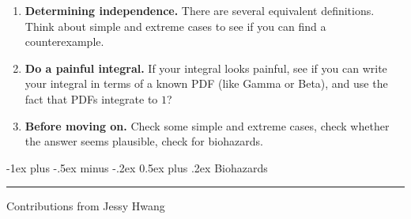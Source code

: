 \documentclass[10pt,landscape]{article}
\makeatletter
\renewcommand{\section}{\@startsection{section}{1}{0mm}%
{-1ex plus -.5ex minus -.2ex}%
{0.5ex plus .2ex}%
{\normalfont\large\bfseries}}
\makeatother
\begin{document}
\begin{multicols*}{3}
\begin{enumerate}
\item \textbf{Determining independence.} There are several equivalent definitions. Think about simple and extreme cases to see if you can find a counterexample.

\item \textbf{Do a painful integral.} If your integral looks painful, see if you can write your integral in terms of a known PDF (like Gamma or Beta), and use the fact that PDFs integrate to $1$?

\item \textbf{Before moving on.} Check some simple and extreme cases, check whether the answer seems plausible, check for biohazards.
\end{enumerate}


\section{Biohazards} \smallskip \hrule height 2pt \smallskip

Contributions from Jessy Hwang


\end{multicols*}
\end{document}
